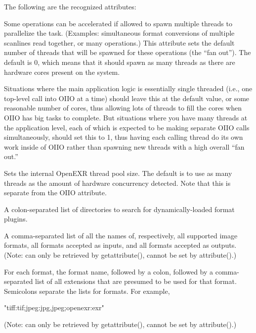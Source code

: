 \noindent The following are the recognized attributes:

\vspace{10pt}
 \label{sec:attribute:threads}
Some \product operations can be accelerated if allowed to spawn multiple
threads to parallelize the task.  (Examples: simultaneous format conversions
of multiple scanlines read together, or many \ImageBufAlgo operations.)
This attribute sets the default number of threads that will be spawned
for these operations (the ``fan out'').
The default is 0, which means that it should spawn as many
threads as there are hardware cores present on the system.

Situations where the main application logic is essentially single threaded
(i.e., one top-level call into OIIO at a time) should leave this at the
default value, or some reasonable number of cores, thus allowing lots of
threads to fill the cores when OIIO has big tasks to complete. But
situations where you have many threads at the application level, each of
which is expected to be making separate OIIO calls simultaneously, should
set this to 1, thus having each calling thread do its own work inside of
OIIO rather than spawning new threads with a high overall ``fan out.''
\apiend

\vspace{10pt}
Sets the internal OpenEXR thread pool size. The default is to use as many
threads as the amount of hardware concurrency detected.
Note that this is separate from the OIIO
 attribute.
\apiend

\vspace{10pt}
A colon-separated list of directories to search for 
dynamically-loaded format plugins.
\apiend

\vspace{10pt}
  
A comma-separated list of all the names of, respectively, all supported
image formats, all formats accepted as inputs, and all formats accepted
as outputs.  (Note: can only be retrieved
by {\cf getattribute()}, cannot be set by {\cf attribute()}.)
\apiend

\vspace{10pt}
For each format, the format name, followed by a colon, followed by
a comma-separated list of all extensions that are presumed to be used
for that format.  Semicolons separate the lists for formats.  For
example,
\begin{code}
     "tiff:tif;jpeg:jpg,jpeg;openexr:exr"
\end{code}
(Note: can only be retrieved
by {\cf getattribute()}, cannot be set by {\cf attribute()}.)
\apiend

